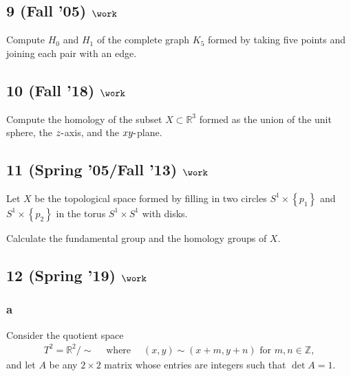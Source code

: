 \hypertarget{fall-05-work}{%
\subsection{\texorpdfstring{9 (Fall '05)
\(\work\)}{9 (Fall '05) \textbackslash work}}\label{fall-05-work}}

Compute \(H_0\) and \(H_1\) of the complete graph \(K_5\) formed by
taking five points and joining each pair with an edge.

\hypertarget{fall-18-work-3}{%
\subsection{\texorpdfstring{10 (Fall '18)
\(\work\)}{10 (Fall '18) \textbackslash work}}\label{fall-18-work-3}}

Compute the homology of the subset \(X \subset {\mathbb{R}}^3\) formed
as the union of the unit sphere, the \(z{\hbox{-}}\)axis, and the
\(xy{\hbox{-}}\)plane.

\hypertarget{spring-05fall-13-work}{%
\subsection{\texorpdfstring{11 (Spring '05/Fall '13)
\(\work\)}{11 (Spring '05/Fall '13) \textbackslash work}}\label{spring-05fall-13-work}}

Let \(X\) be the topological space formed by filling in two circles
\(S^1 \times \left\{{p_1 }\right\}\) and
\(S^1 \times \left\{{p_2 }\right\}\) in the torus \(S^1 \times S^1\)
with disks.

Calculate the fundamental group and the homology groups of \(X\).

\hypertarget{spring-19-work-1}{%
\subsection{\texorpdfstring{12 (Spring '19)
\(\work\)}{12 (Spring '19) \textbackslash work}}\label{spring-19-work-1}}

\hypertarget{a-21}{%
\subsubsection{a}\label{a-21}}

Consider the quotient space
\begin{align*}
T^2 = {\mathbb{R}}^2 / \sim {\quad \operatorname{where} \quad} (x, y) \sim (x + m, y + n) \text{ for } m, n \in {\mathbb{Z}}
,\end{align*}
and let \(A\) be any \(2 \times 2\) matrix whose entries are integers
such that \(\det A = 1\).


